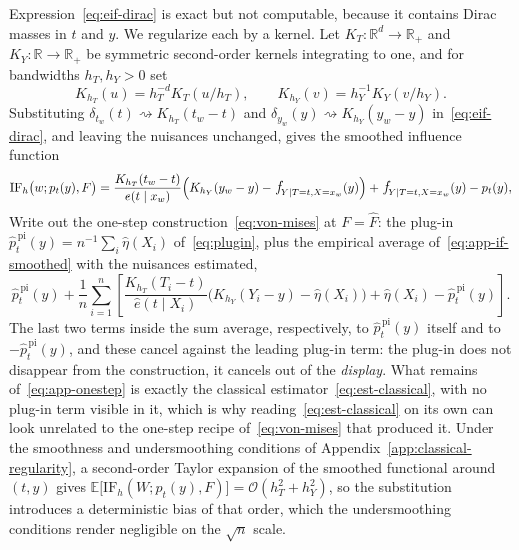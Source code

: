 \documentclass[11pt]{article}
\theoremstyle{plain}
\theoremstyle{definition}
\theoremstyle{remark}
\newcommand{\pE}{\ensuremath{\mathbb{E}}}
\newcommand{\R}{\mathbb{R}}
\newcommand{\pf}[1]{\ensuremath{\,\mathlarger{\textit{f}}_{#1}}}
\newcommand{\cO}{\mathcal{O}}
\newcommand{\IF}{\mathrm{IF}}
\newcommand{\gps}{e}
\begin{document}
Expression~\eqref{eq:eif-dirac} is exact but not computable, because it contains Dirac masses
in $t$ and $y$. We regularize each by a kernel. Let $K_T : \R^{d} \to \R_+$ and
$K_Y : \R \to \R_+$ be symmetric second-order kernels integrating to one, and for bandwidths
$h_T, h_Y > 0$ set
\begin{equation}
K_{h_T}(u) = h_T^{-d} K_T(u/h_T), \qquad
K_{h_Y}(v) = h_Y^{-1} K_Y(v/h_Y).
\label{eq:kernels}
\end{equation}
Substituting $\delta_{t_w}(t) \rightsquigarrow K_{h_T}(t_w - t)$ and
$\delta_{y_w}(y) \rightsquigarrow K_{h_Y}(y_w - y)$ in~\eqref{eq:eif-dirac}, and leaving the
nuisances unchanged, gives the smoothed influence function
\begin{equation}
\IF_{h}\big(w;p_t(y),F\big)
= \frac{K_{h_T}(t_w-t)}{\gps(t \mid x_w)}
\Big( K_{h_Y}(y_w-y) - \pf{Y \mid T=t,X=x_w}(y) \Big)
+ \pf{Y \mid T=t,X=x_w}(y) - p_t(y),
\label{eq:app-if-smoothed}
\end{equation}
Write out the one-step construction~\eqref{eq:von-mises} at $F=\widehat F$: the plug-in
$\widehat p^{\,\mathrm{pi}}_t(y) = n^{-1}\sum_i\widehat\eta(X_i)$ of~\eqref{eq:plugin}, plus the
empirical average of~\eqref{eq:app-if-smoothed} with the nuisances estimated,
\begin{equation}
\widehat p^{\,\mathrm{pi}}_t(y)
+ \frac1n\sum_{i=1}^n\left[
\frac{K_{h_T}(T_i-t)}{\widehat\gps(t\mid X_i)}\Big(K_{h_Y}(Y_i-y)-\widehat\eta(X_i)\Big)
+ \widehat\eta(X_i) - \widehat p^{\,\mathrm{pi}}_t(y)
\right] .
\label{eq:app-onestep}
\end{equation}
The last two terms inside the sum average, respectively, to $\widehat p^{\,\mathrm{pi}}_t(y)$
itself and to $-\widehat p^{\,\mathrm{pi}}_t(y)$, and these cancel against the leading plug-in
term: the plug-in does not disappear from the construction, it cancels out of the
\emph{display}. What remains of~\eqref{eq:app-onestep} is exactly the classical
estimator~\eqref{eq:est-classical}, with no plug-in term visible in it, which is why
reading~\eqref{eq:est-classical} on its own can look unrelated to the one-step recipe
of~\eqref{eq:von-mises} that produced it. Under the smoothness
and undersmoothing conditions of Appendix~\ref{app:classical-regularity}, a second-order Taylor
expansion of the smoothed functional around $(t,y)$ gives
$\pE\big[\IF_h(W;p_t(y),F)\big] = \cO(h_T^2 + h_Y^2)$, so the substitution introduces a
deterministic bias of that order, which the undersmoothing conditions render negligible on the
$\sqrt n$ scale.
\end{document}
